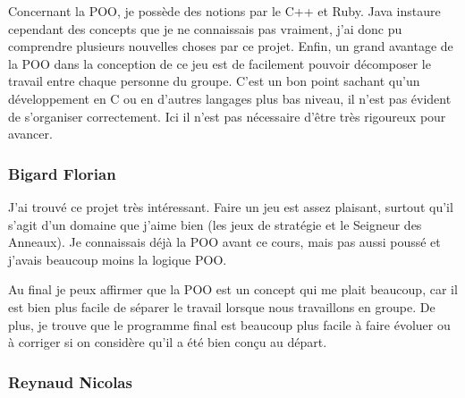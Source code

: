\documentclass{article}
\begin{document}
  Concernant la POO, je possède des notions par le C++ et Ruby.
  Java instaure cependant des concepts que je ne connaissais pas vraiment, j'ai donc pu comprendre plusieurs nouvelles choses par ce projet. 
  Enfin, un grand avantage de la POO dans la conception de ce jeu est de facilement pouvoir décomposer le travail entre chaque personne du groupe.
  C'est un bon point sachant qu'un développement en C ou en d'autres langages plus bas niveau, il n'est pas évident de s'organiser correctement.
  Ici il n'est pas nécessaire d'être très rigoureux pour avancer.

  \subsubsection{Bigard Florian}
  J'ai trouvé ce projet très intéressant.
  Faire un jeu est assez plaisant, surtout qu'il s'agit d'un domaine que j'aime bien (les jeux de stratégie et le Seigneur des Anneaux).
  Je connaissais déjà la POO avant ce cours, mais pas aussi poussé et j'avais beaucoup moins la logique POO.

  Au final je peux affirmer que la POO est un concept qui me plait beaucoup, car il est bien plus facile de séparer le travail lorsque nous travaillons en groupe.
  De plus, je trouve que le programme final est beaucoup plus facile à faire évoluer ou à corriger si on considère qu'il a été bien conçu au départ.

  \subsubsection{Reynaud Nicolas}
\end{document}
